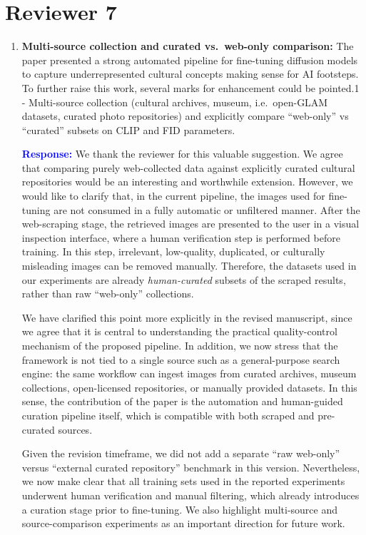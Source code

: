 \documentclass[11pt]{article}
\begin{document}
\section*{Reviewer 7}

\begin{enumerate}[label=\textbf{C\arabic*.}, leftmargin=*]
\item \textbf{Multi-source collection and curated vs.\ web-only comparison:} The paper presented a strong automated pipeline for fine-tuning diffusion models to capture underrepresented cultural concepts making sense for AI footsteps. To further raise this work, several marks for enhancement could be pointed.1 - Multi-source collection (cultural archives, museum, i.e.\ open-GLAM datasets, curated photo repositories) and explicitly compare ``web-only'' vs ``curated'' subsets on CLIP and FID parameters.

\textbf{\textcolor{blue}{Response:}} We thank the reviewer for this valuable suggestion. We agree that comparing purely web-collected data against explicitly curated cultural repositories would be an interesting and worthwhile extension. However, we would like to clarify that, in the current pipeline, the images used for fine-tuning are not consumed in a fully automatic or unfiltered manner. After the web-scraping stage, the retrieved images are presented to the user in a visual inspection interface, where a human verification step is performed before training. In this step, irrelevant, low-quality, duplicated, or culturally misleading images can be removed manually. Therefore, the datasets used in our experiments are already \emph{human-curated} subsets of the scraped results, rather than raw ``web-only'' collections.

We have clarified this point more explicitly in the revised manuscript, since we agree that it is central to understanding the practical quality-control mechanism of the proposed pipeline. In addition, we now stress that the framework is not tied to a single source such as a general-purpose search engine: the same workflow can ingest images from curated archives, museum collections, open-licensed repositories, or manually provided datasets. In this sense, the contribution of the paper is the automation and human-guided curation pipeline itself, which is compatible with both scraped and pre-curated sources.

Given the revision timeframe, we did not add a separate ``raw web-only'' versus ``external curated repository'' benchmark in this version. Nevertheless, we now make clear that all training sets used in the reported experiments underwent human verification and manual filtering, which already introduces a curation stage prior to fine-tuning. We also highlight multi-source and source-comparison experiments as an important direction for future work.


\end{enumerate}
\end{document}
